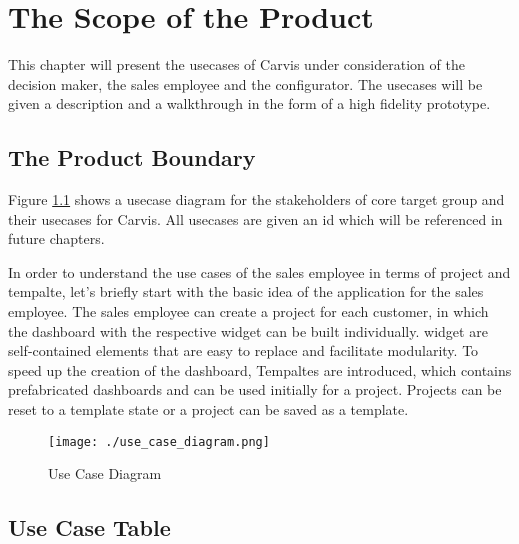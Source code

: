 \chapter{The Scope of the Product}
This chapter will present the \glspl{usecase} of Carvis under consideration of the decision maker, the sales employee and the configurator. The \glspl{usecase} will be given a description and a walkthrough in the form of a high fidelity prototype.

\section{The Product Boundary}

Figure \ref{SopeOfProduct:ContextDiagram} shows a \gls{usecase} diagram for the \glspl{stakeholder} of core target group and their \glspl{usecase} for Carvis. All \glspl{usecase} are given an id which will be referenced in future chapters.

In order to understand the use cases of the sales employee in terms of project and tempalte, let's briefly start with the basic idea of the application for the sales employee. The sales employee can create a project for each customer, in which the dashboard with the respective \gls{widget} can be built individually. \gls{widget} are self-contained elements that are easy to replace and facilitate modularity. To speed up the creation of the dashboard, Tempaltes are introduced, which contains prefabricated dashboards and can be used initially for a project. Projects can be reset to a template state or a project can be saved as a template.

\begin{figure}[H]
  \centering
  \texttt{[image: ./use\_case\_diagram.png]}
  \caption{Use Case Diagram}
  \label{SopeOfProduct:ContextDiagram}
\end{figure}

\section{Use Case Table}

